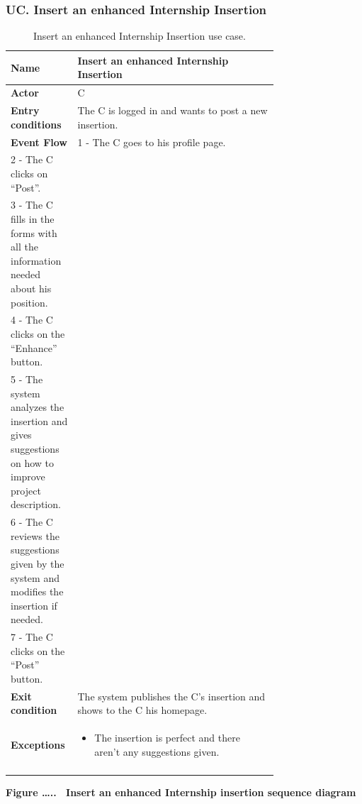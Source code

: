 \subsubsection*{UC\cuc . Insert an enhanced Internship Insertion}
\begin{center}
    \begin{longtable}{|l|p{0.75\linewidth}|}
        \hline
        \textbf{Name}               & Insert an enhanced Internship Insertion\\
        \hline
        \textbf{Actor}              & C\\
        \hline
        \textbf{Entry conditions}   & The C is logged in and wants to post a new insertion.\\
        \hline
        \textbf{Event Flow}         & 
        1 - The C goes to his profile page. \\
        2 - The C clicks on “Post”. \\
        3 - The C fills in the forms with all the information needed about his position. \\
        4 - The C clicks on the “Enhance” button. \\
        5 - The system analyzes the insertion and gives suggestions on how to improve project description. \\
        6 - The C reviews the suggestions given by the system and modifies the insertion if needed. \\
        7 - The C clicks on the “Post” button. \\
        \hline
        \textbf{Exit condition}   & The system publishes the C’s insertion and shows to the C his homepage. \\       
        \hline
        \textbf{Exceptions}       & \begin{itemize}
            \item The insertion is perfect and there aren’t any suggestions given.
        \end{itemize}\\
        \hline
        \caption{Insert an enhanced Internship Insertion use case.}
        \label{tab: enhanced_internship_insertion_use_case}
    \end{longtable}
\end{center}


\textbf{Figure \ldots..~ Insert an enhanced Internship insertion
sequence diagram}


